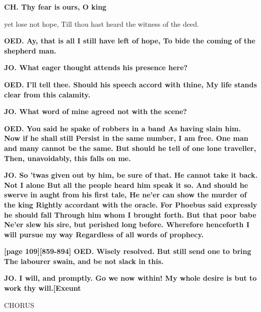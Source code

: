 \documentclass[11pt,letter]{book}
\begin{document}
\par \textbf{CH. Thy fear is ours, O king}
\par   yet lose not hope, Till thou hast heard the witness of the deed.

\par \textbf{OED. Ay, that is all I still have left of hope, To bide the coming of the shepherd man.}
\par 

\par \textbf{JO. What eager thought attends his presence here?}
\par 

\par \textbf{OED. I’ll tell thee. Should his speech accord with thine, My life stands clear from this calamity.}
\par 

\par \textbf{JO. What word of mine agreed not with the scene?}
\par 

\par \textbf{OED. You said he spake of robbers in a band As having slain him. Now if he shall still Persist in the same number, I am free. One man and many cannot be the same. But should he tell of one lone traveller, Then, unavoidably, this falls on me.}
\par 

\par \textbf{JO. So ’twas given out by him, be sure of that. He cannot take it back. Not I alone But all the people heard him speak it so. And should he swerve in aught from his first tale, He ne’er can show the murder of the king Rightly accordant with the oracle. For Phoebus said expressly he should fall Through him whom I brought forth. But that poor babe Ne’er slew his sire, but perished long before. Wherefore henceforth I will pursue my way Regardless of all words of prophecy.}
\par 

\par \textbf{[page 109][859-894] OED. Wisely resolved. But still send one to bring The labourer swain, and be not slack in this.}
\par 

\par \textbf{JO. I will, and promptly. Go we now within! My whole desire is but to work thy will.[Exeunt}
\par 

\par  CHORUS
\end{document}

